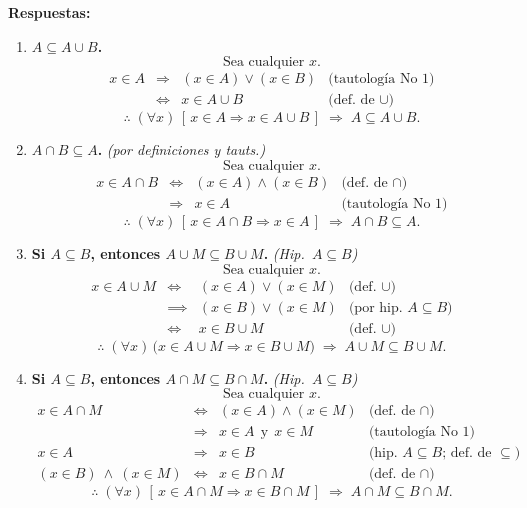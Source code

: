 \documentclass[12pt,letterpaper]{exam}
\begin{document}
\begin{enumerate}
    \textbf{Respuestas:}
    \begin{enumerate}[label=\alph*)]

\item \textbf{$A \subseteq A \cup B$.} 
\[
\text{Sea cualquier } x.
\]
\[
\begin{array}{rcll}
x\in A
&\Rightarrow& (x\in A)\lor(x\in B) 
& \text{(tautología No 1)}\\[2pt]
&\iff& x\in A\cup B 
& \text{(def.\ de $\cup$)}
\end{array}
\]
\[
\therefore\;(\forall x)\,[\,x\in A\Rightarrow x\in A\cup B\,]\;\Rightarrow\; A\subseteq A\cup B.
\]

\item \textbf{$A \cap B \subseteq A$.} \; \textit{(por definiciones y tauts.)}
\[
\text{Sea cualquier } x.
\]
\[
\begin{array}{rcll}
x\in A\cap B
&\iff& (x\in A)\land(x\in B) 
& \text{(def.\ de $\cap$)}\\[2pt]
&\Rightarrow& x\in A 
& \text{(tautología No 1)}
\end{array}
\]
\[
\therefore\;(\forall x)\,[\,x\in A\cap B\Rightarrow x\in A\,]\;\Rightarrow\; A\cap B\subseteq A.
\]

\item \textbf{Si $A \subseteq B$, entonces $A \cup M \subseteq B \cup M$.} \; \textit{(Hip.\ $A\subseteq B$)}
\[
\text{Sea cualquier } x.
\]
\[
\begin{array}{rcll}
x \in A \cup M
&\iff& (x \in A) \lor (x \in M) & \text{(def.\ $\cup$)}\\[2pt]
&\implies& (x \in B) \lor (x \in M) & \text{(por hip.\ $A\subseteq B$)}\\[2pt]
&\iff& x \in B \cup M & \text{(def.\ $\cup$)}
\end{array}
\]
\[
\therefore\; (\forall x)\,\big(x \in A \cup M \Rightarrow x \in B \cup M\big)
\;\Rightarrow\; A \cup M \subseteq B \cup M.
\]

\item \textbf{Si $A \subseteq B$, entonces $A \cap M \subseteq B \cap M$.} \; \textit{(Hip.\ $A\subseteq B$)}
\[
\text{Sea cualquier } x.
\]
\[
\begin{array}{rcll}
x\in A\cap M
&\iff& (x\in A)\land(x\in M) 
& \text{(def.\ de $\cap$)}\\[2pt]
&\Rightarrow& x\in A \ \ \text{y}\ \ x\in M 
& \text{(tautología No 1)}\\[2pt]
x\in A &\Rightarrow& x\in B 
& \text{(hip.\ $A\subseteq B$; def.\ de $\subseteq$)}\\[2pt]
(x\in B)\ \land\ (x\in M) 
&\iff& x\in B\cap M 
& \text{(def.\ de $\cap$)}
\end{array}
\]
\[
\therefore\;(\forall x)\,[\,x\in A\cap M\Rightarrow x\in B\cap M\,]\;\Rightarrow\; A\cap M\subseteq B\cap M.
\]


\end{enumerate}
\end{enumerate}
\end{document}
